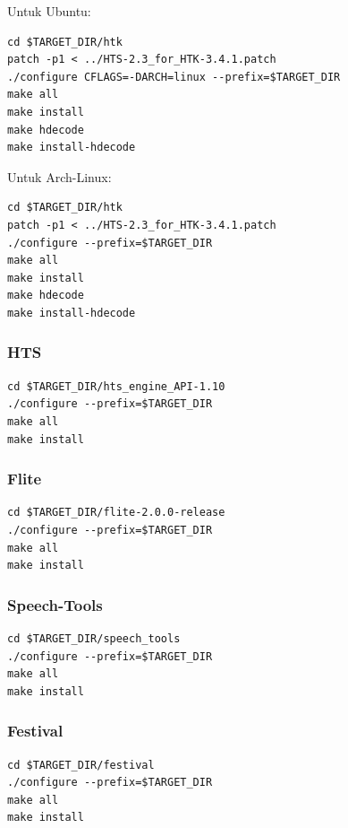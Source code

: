 \documentclass[12pt,]{article}
\begin{document}
	Untuk Ubuntu:
	\begin{verbatim}
cd $TARGET_DIR/htk
patch -p1 < ../HTS-2.3_for_HTK-3.4.1.patch
./configure CFLAGS=-DARCH=linux --prefix=$TARGET_DIR
make all
make install
make hdecode
make install-hdecode
	\end{verbatim}
	
	\newpage
	Untuk Arch-Linux:
	\begin{verbatim}
cd $TARGET_DIR/htk
patch -p1 < ../HTS-2.3_for_HTK-3.4.1.patch
./configure --prefix=$TARGET_DIR
make all
make install
make hdecode
make install-hdecode
	\end{verbatim}
	
	\subsubsection{HTS}
	\begin{verbatim}
cd $TARGET_DIR/hts_engine_API-1.10
./configure --prefix=$TARGET_DIR
make all
make install
	\end{verbatim}
	
	\subsubsection{Flite}
	\begin{verbatim}
cd $TARGET_DIR/flite-2.0.0-release
./configure --prefix=$TARGET_DIR
make all
make install
	\end{verbatim}

	\subsubsection{Speech-Tools}
	\begin{verbatim}
cd $TARGET_DIR/speech_tools
./configure --prefix=$TARGET_DIR
make all
make install
	\end{verbatim}
	
	\subsubsection{Festival}
	\begin{verbatim}
cd $TARGET_DIR/festival
./configure --prefix=$TARGET_DIR
make all
make install
	\end{verbatim}
	
\end{document}
